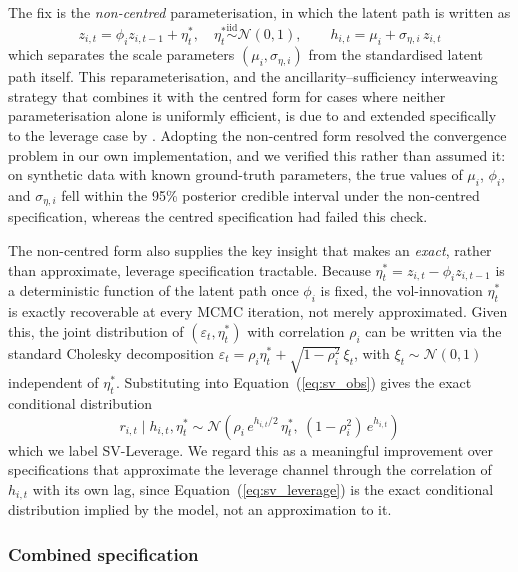 \documentclass[preprint,12pt,authoryear]{elsarticle}
\begin{document}
The fix is the \emph{non-centred} parameterisation, in which the latent path is written as
\begin{equation}
  z_{i,t} = \phi_i z_{i,t-1} + \eta_t^*, \quad \eta_t^* \overset{\text{iid}}{\sim} \mathcal{N}(0,1), \qquad h_{i,t} = \mu_i + \sigma_{\eta,i}\, z_{i,t}
  \label{eq:noncentred}
\end{equation}
which separates the scale parameters $(\mu_i, \sigma_{\eta,i})$ from the standardised latent path itself. This reparameterisation, and the ancillarity--sufficiency interweaving strategy that combines it with the centred form for cases where neither parameterisation alone is uniformly efficient, is due to \citet{kastnerfruhwirthschnatter2014} and extended specifically to the leverage case by \citet{hosszejnikastner2019}. Adopting the non-centred form resolved the convergence problem in our own implementation, and we verified this rather than assumed it: on synthetic data with known ground-truth parameters, the true values of $\mu_i$, $\phi_i$, and $\sigma_{\eta,i}$ fell within the 95\% posterior credible interval under the non-centred specification, whereas the centred specification had failed this check.

The non-centred form also supplies the key insight that makes an \emph{exact}, rather than approximate, leverage specification tractable. Because $\eta_t^* = z_{i,t} - \phi_i z_{i,t-1}$ is a deterministic function of the latent path once $\phi_i$ is fixed, the vol-innovation $\eta_t^*$ is exactly recoverable at every MCMC iteration, not merely approximated. Given this, the joint distribution of $(\varepsilon_t, \eta_t^*)$ with correlation $\rho_i$ can be written via the standard Cholesky decomposition $\varepsilon_t = \rho_i \eta_t^* + \sqrt{1-\rho_i^2}\,\xi_t$, with $\xi_t \sim \mathcal{N}(0,1)$ independent of $\eta_t^*$. Substituting into Equation~(\ref{eq:sv_obs}) gives the exact conditional distribution
\begin{equation}
  r_{i,t} \mid h_{i,t}, \eta_t^* \sim \mathcal{N}\!\left(\rho_i\, e^{h_{i,t}/2}\, \eta_t^*,\ (1-\rho_i^2)\, e^{h_{i,t}}\right)
  \label{eq:sv_leverage}
\end{equation}
which we label SV-Leverage. We regard this as a meaningful improvement over specifications that approximate the leverage channel through the correlation of $h_{i,t}$ with its own lag, since Equation~(\ref{eq:sv_leverage}) is the exact conditional distribution implied by the model, not an approximation to it.

\subsubsection{Combined specification}
\end{document}
